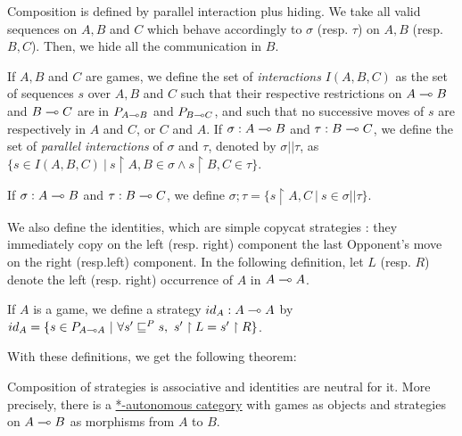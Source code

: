 Composition is defined by parallel interaction plus hiding. We take all
valid sequences on \(A, B\) and \(C\) which behave accordingly to
\(\sigma\) (resp. \(\tau\)) on \(A, B\) (resp. \(B,C\)). Then, we hide
all the communication in \(B\).

\begin{definition}
If $A, B$ and $C$ are games, we define the set of \emph{interactions} $I(A,B,C)$ as the set of sequences $s$ over $A, B$ and $C$ such that their respective restrictions on
$A\multimap B$ and $B\multimap C$ are in $P_{A\multimap B}$ and $P_{B\multimap C}$, and such that no successive
moves of $s$ are respectively in $A$ and $C$, or $C$ and $A$.
If $\sigma:A\multimap B$ and $\tau:B\multimap C$, we define the set of \emph{parallel interactions} of
$\sigma$ and $\tau$, denoted by $\sigma||\tau$, as $\{s\in I(A,B,C)~|~s\upharpoonright A,B\in \sigma \wedge s\upharpoonright B,C \in \tau\}$.
\end{definition}

\begin{definition}[Composition]
If $\sigma:A\multimap B$ and $\tau:B\multimap C$, we define $\sigma;\tau = \{s\upharpoonright A,C~|~s\in \sigma||\tau\}$.
\end{definition}

We also define the identities, which are simple copycat strategies :
they immediately copy on the left (resp. right) component the last
Opponent's move on the right (resp.left) component. In the following
definition, let \(L\) (resp. \(R\)) denote the left (resp. right)
occurrence of \(A\) in \(A\multimap A\).

\begin{definition}[Identities]
If $A$ is a game, we define a strategy $id_A: A\multimap A$ by $id_A = \{s\in P_{A\multimap A}~|~\forall s'\sqsubseteq^P s,~s'\upharpoonright L = s' \upharpoonright R\}$.
\end{definition}

With these definitions, we get the following theorem:

\begin{theorem}
Composition of strategies is associative and identities are neutral for it. More precisely, there is a \hyperref[autonomous-categories]{*-autonomous category} with games as objects and strategies on $A\multimap B$ as morphisms from $A$ to $B$.
\end{theorem}



